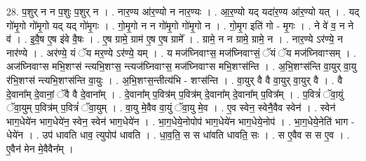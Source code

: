 \documentclass[17pt]{extarticle}
\begin{document}
28. प॒शुर् न न प॒शुः प॒शुर् न । . नार॒ण्य आ॑र॒ण्यो न नार॒ण्यः । . आ॒र॒ण्यो यद् यदा॑र॒ण्य आ॑र॒ण्यो यत् । . यद् गो॑मृ॒गो गो॑मृ॒गो यद् यद् गो॑मृ॒गः । . गो॒मृ॒गो न न गो॑मृ॒गो गो॑मृ॒गो न । . गो॒मृ॒ग इति॑ गो - मृ॒गः । . ने वे॑ व॒ न ने व॑ । . इ॒वै॒ष ए॒ष इ॑वे वै॒षः । . ए॒ष ग्रामे॒ ग्राम॑ ए॒ष ए॒ष ग्रामे᳚ । . ग्रामे॒ न न ग्रामे॒ ग्रामे॒ न । . नार॒ण्ये ऽर॑ण्ये॒ न नार॑ण्ये । . अर॑ण्ये॒ यं ॅय मर॒ण्ये ऽर॑ण्ये॒ यम् । . य मज॑घ्निवाꣳस॒ मज॑घ्निवाꣳसं॒ ॅयं ॅय मज॑घ्निवाꣳसम् । . अज॑घ्निवाꣳस मभि॒शꣳस॑ न्त्यभि॒शꣳस॒ न्त्यज॑घ्निवाꣳस॒ मज॑घ्निवाꣳस मभि॒शꣳस॑न्ति । . अ॒भि॒शꣳस॑न्ति वा॒युर् वा॒यु र॑भि॒शꣳस॑ न्त्यभि॒शꣳस॑न्ति वा॒युः । . अ॒भि॒शꣳस॒न्तीत्य॑भि - शꣳस॑न्ति । . वा॒युर् वै वै वा॒युर् वा॒युर् वै । . वै दे॒वाना᳚म् दे॒वानां॒ ॅवै वै दे॒वाना᳚म् । . दे॒वाना᳚म् प॒वित्र॑म् प॒वित्र॑म् दे॒वाना᳚म् दे॒वाना᳚म् प॒वित्र᳚म् । . प॒वित्रं॑ ॅवा॒युं ॅवा॒युम् प॒वित्र॑म् प॒वित्रं॑ ॅवा॒युम् । . वा॒यु मे॒वैव वा॒युं ॅवा॒यु मे॒व । . ए॒व स्वेन॒ स्वेनै॒वैव स्वेन॑ । . स्वेन॑ भाग॒धेये॑न भाग॒धेये॑न॒ स्वेन॒ स्वेन॑ भाग॒धेये॑न । . भा॒ग॒धेये॒नोपोप॑ भाग॒धेये॑न भाग॒धेये॒नोप॑ । . भा॒ग॒धेये॒नेति॑ भाग - धेये॑न । . उप॑ धावति धाव॒ त्युपोप॑ धावति । . धा॒व॒ति॒ स स धा॑वति धावति॒ सः । . स ए॒वैव स स ए॒व । . ए॒वैन॑ मेन मे॒वैवैन᳚म् । \newline
\end{document}
